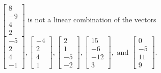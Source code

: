 \begin{exercise}
\begin{exerciseStatement}
  \end{exerciseStatement}
  \begin{exerciseAnswer}
   \(\left[\begin{array}{c}
8 \\
-9 \\
4 \\
2
\end{array}\right]\) 
  	 is not  
	a linear combination of the vectors \(\left[\begin{array}{c}
-5 \\
2 \\
4 \\
-1
\end{array}\right] , \left[\begin{array}{c}
-4 \\
2 \\
4 \\
1
\end{array}\right] , \left[\begin{array}{c}
2 \\
1 \\
-5 \\
-2
\end{array}\right] , \left[\begin{array}{c}
15 \\
-6 \\
-12 \\
3
\end{array}\right] , \text{ and } \left[\begin{array}{c}
0 \\
-5 \\
11 \\
9
\end{array}\right]\).

	
  


  \end{exerciseAnswer}
\end{exercise}
